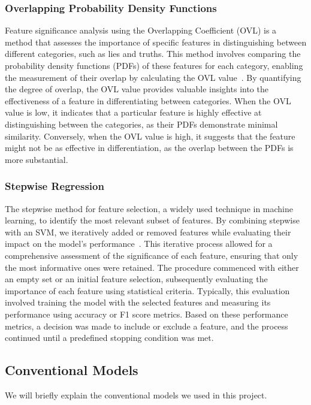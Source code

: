\documentclass[12pt]{article}
\begin{document}
\subsubsection{Overlapping Probability Density Functions}
Feature significance analysis using the Overlapping Coefficient (OVL) is a method that assesses the importance of specific features in distinguishing between different categories, such as lies and truths. This method involves comparing the probability density functions (PDFs) of these features for each category, enabling the measurement of their overlap by calculating the OVL value~\cite{namin2020linguistic}. By quantifying the degree of overlap, the OVL value provides valuable insights into the effectiveness of a feature in differentiating between categories. When the OVL value is low, it indicates that a particular feature is highly effective at distinguishing between the categories, as their PDFs demonstrate minimal similarity. Conversely, when the OVL value is high, it suggests that the feature might not be as effective in differentiation, as the overlap between the PDFs is more substantial.
\subsubsection{Stepwise Regression}
The stepwise method for feature selection, a widely used technique in machine learning, to identify the most relevant subset of features. By combining stepwise with an SVM, we iteratively added or removed features while evaluating their impact on the model's performance~\cite{arshad2021proximally}. This iterative process allowed for a comprehensive assessment of the significance of each feature, ensuring that only the most informative ones were retained. The procedure commenced with either an empty set or an initial feature selection, subsequently evaluating the importance of each feature using statistical criteria. Typically, this evaluation involved training the model with the selected features and measuring its performance using accuracy or F1 score metrics. Based on these performance metrics, a decision was made to include or exclude a feature, and the process continued until a predefined stopping condition was met.
\subsection{Conventional Models}
We will briefly explain the conventional models we used in this project.
\end{document}
